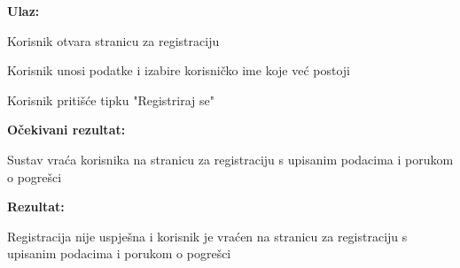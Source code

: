  			\noindent {}
 			\begin{packed_item}
 				
 				\item  \textbf{Ulaz:}
 				
 				\item[] \begin{packed_enum}
 					
 					\item Korisnik otvara stranicu za registraciju
 					\item Korisnik unosi podatke i izabire korisničko ime koje već postoji
 					\item Korisnik pritišće tipku "Registriraj se"
 					
 				\end{packed_enum}
 				
 				\item \textbf{Očekivani rezultat:}
 				
 				\item[] \begin{packed_enum}
 					
 					\item Sustav vraća korisnika na stranicu za registraciju s upisanim podacima i porukom o pogrešci
 					
 				\end{packed_enum}		
 				
 				\item \textbf{Rezultat:} 
 				
 				\item[] \begin{packed_enum}
 					
 					\item Registracija nije uspješna i korisnik je vraćen na stranicu za registraciju s upisanim podacima i porukom o pogrešci
 					
 				\end{packed_enum}
 					
 				
 			\end{packed_item}
 		
